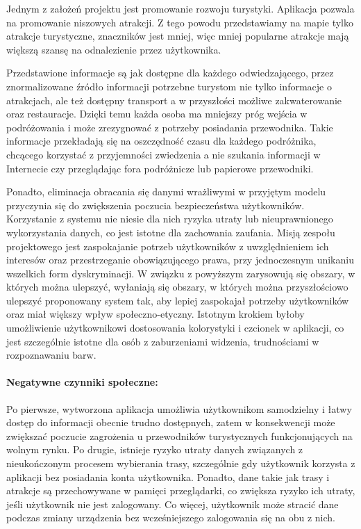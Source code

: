 \indent Jednym z założeń projektu jest promowanie rozwoju turystyki. Aplikacja pozwala na promowanie niszowych atrakcji.
Z tego powodu przedstawiamy na mapie tylko atrakcje turystyczne, znaczników jest mniej, więc mniej popularne atrakcje mają większą szansę na odnalezienie przez użytkownika.

\indent Przedstawione informacje są jak dostępne dla każdego odwiedzającego, przez znormalizowane źródło informacji potrzebne turystom nie tylko informacje o atrakcjach, ale też dostępny transport a w przyszłości  możliwe zakwaterowanie oraz restauracje.
Dzięki temu każda osoba ma mniejszy próg wejścia w podróżowania i może zrezygnować z potrzeby posiadania przewodnika.
Takie informacje przekładają się na oszczędność czasu dla każdego podróżnika, chcącego korzystać z przyjemności zwiedzenia a nie szukania informacji w Internecie czy przeglądając fora podróżnicze lub papierowe przewodniki.


\indent Ponadto, eliminacja obracania się danymi wrażliwymi w przyjętym modelu przyczynia się do zwiększenia poczucia bezpieczeństwa użytkowników. Korzystanie z systemu nie niesie dla nich ryzyka utraty lub nieuprawnionego wykorzystania danych, co jest istotne dla zachowania zaufania. 
Misją zespołu projektowego jest zaspokajanie potrzeb użytkowników z uwzględnieniem ich interesów oraz przestrzeganie obowiązującego prawa, przy jednoczesnym unikaniu wszelkich form dyskryminacji. \newline
\indent W związku z powyższym zarysowują się obszary, w których można ulepszyć, wyłaniają się obszary, w których można przyszłościowo ulepszyć proponowany system tak, aby lepiej zaspokajał potrzeby użytkowników oraz miał większy wpływ społeczno-etyczny. Istotnym krokiem byłoby umożliwienie użytkownikowi dostosowania kolorystyki i czcionek w aplikacji, co jest szczególnie istotne dla osób z zaburzeniami widzenia, trudnościami w rozpoznawaniu barw.

\paragraph{Negatywne czynniki społeczne:}


\indent Po pierwsze, wytworzona aplikacja umożliwia użytkownikom samodzielny i łatwy dostęp do informacji obecnie trudno dostępnych, zatem w konsekwencji 
może zwiększać poczucie zagrożenia u przewodników turystycznych funkcjonujących na wolnym rynku. 
\newline
\indent Po drugie, istnieje ryzyko utraty danych związanych z nieukończonym procesem wybierania trasy, szczególnie gdy użytkownik korzysta z aplikacji bez posiadania konta użytkownika. Ponadto, dane takie jak trasy i atrakcje są przechowywane w pamięci przeglądarki, co zwiększa ryzyko ich utraty, jeśli użytkownik nie jest zalogowany. Co więcej, użytkownik może stracić dane podczas zmiany urządzenia bez wcześniejszego zalogowania się na obu z nich.\newline 

